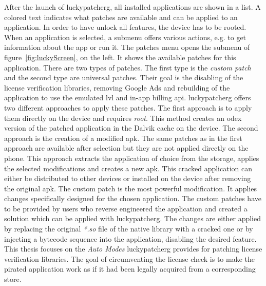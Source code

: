 After the launch of \gls{luckypatcherg}, all installed applications are shown in a list.
A colored text indicates what patches are available and can be applied to an application.
In order to have unlock all features, the device has to be rooted.
\newline
When an application is selected, a submenu offers various actions, e.g. to get information about the app or run it.
The patches menu opens the submenu of figure~\ref{fig:luckyScreen}, on the left.
It shows the available patches for this application.
\newline
There are two types of patches.
The first type is the \textit{custom patch} and the second type are universal patches.
Their goal is the disabling of the license verification libraries, removing Google Ads and rebuilding of the application to use the emulated \gls{lvl} and in-app billing \gls{api}.
\newline
\gls{luckypatcherg} offers two different approaches to apply these patches.
The first approach is to apply them directly on the device and requires \textit{root}.
This method creates an \gls{odex} version of the patched application in the Dalvik cache on the device.
The second approach is the creation of a modified \gls{apk}.
The same patches as in the first approach are available after selection but they are not applied directly on the phone.
This approach extracts the application of choice from the storage, applies the selected modifications and creates a new \gls{apk}.
This cracked application can either be distributed to other devices or installed on the device after removing the original \gls{apk}.
\newline
The custom patch is the most powerful modification.
It applies changes specifically designed for the chosen application.
The custom patches have to be provided by users who reverse engineered the application and created a solution which can be applied with \gls{luckypatcherg}.
The changes are either applied by replacing the original \textit{*.so} file of the native library with a cracked one or by injecting a bytecode sequence into the application, disabling the desired feature.
\newline
\newline
This thesis focuses on the \textit{Auto Modes} \gls{luckypatcherg} provides for patching license verification libraries.
The goal of circumventing the license check is to make the pirated application work as if it had been legally acquired from a corresponding store.
\newline
